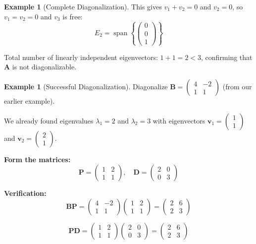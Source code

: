 \documentclass[12pt]{article}
\numberwithin{equation}{section}
\newcommand{\vect}[1]{\boldsymbol{#1}}   %
\newcommand{\mat}[1]{\mathbf{#1}}        %
\newcommand{\Span}{\operatorname{span}}
\theoremstyle{plain}
\theoremstyle{definition}
\newtheorem{example}[theorem]{Example}
\theoremstyle{remark}
\begin{document}
\begin{example}[Complete Diagonalization]
This gives $v_1 + v_2 = 0$ and $v_2 = 0$, so $v_1 = v_2 = 0$ and $v_3$ is free:
$$E_2 = \Span\left\{\begin{pmatrix} 0 \\ 0 \\ 1 \end{pmatrix}\right\}$$

Total number of linearly independent eigenvectors: $1 + 1 = 2 < 3$, confirming that $\mat{A}$ is not diagonalizable.
\end{example}

\begin{example}[Successful Diagonalization]
Diagonalize $\mat{B} = \begin{pmatrix} 4 & -2 \\ 1 & 1 \end{pmatrix}$ (from our earlier example).

We already found eigenvalues $\lambda_1 = 2$ and $\lambda_2 = 3$ with eigenvectors $\vect{v}_1 = \begin{pmatrix} 1 \\ 1 \end{pmatrix}$ and $\vect{v}_2 = \begin{pmatrix} 2 \\ 1 \end{pmatrix}$.

\textbf{Form the matrices:}
$$\mat{P} = \begin{pmatrix} 1 & 2 \\ 1 & 1 \end{pmatrix}, \quad \mat{D} = \begin{pmatrix} 2 & 0 \\ 0 & 3 \end{pmatrix}$$

\textbf{Verification:}
$$\mat{B}\mat{P} = \begin{pmatrix} 4 & -2 \\ 1 & 1 \end{pmatrix}\begin{pmatrix} 1 & 2 \\ 1 & 1 \end{pmatrix} = \begin{pmatrix} 2 & 6 \\ 2 & 3 \end{pmatrix}$$

$$\mat{P}\mat{D} = \begin{pmatrix} 1 & 2 \\ 1 & 1 \end{pmatrix}\begin{pmatrix} 2 & 0 \\ 0 & 3 \end{pmatrix} = \begin{pmatrix} 2 & 6 \\ 2 & 3 \end{pmatrix}$$


\end{example}
\end{document}

